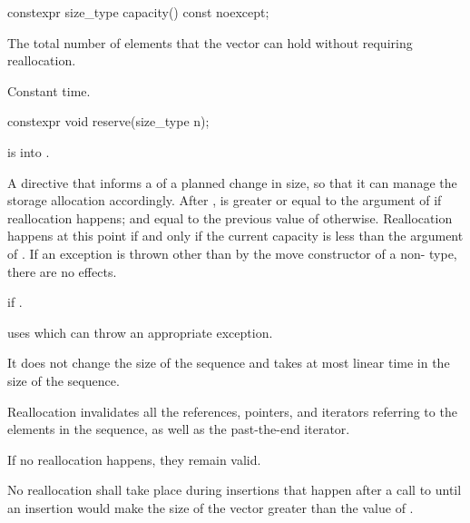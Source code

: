 %
\begin{itemdecl}
constexpr size_type capacity() const noexcept;
\end{itemdecl}

\begin{itemdescr}
\pnum
\returns
The total number of elements that the vector can hold
without requiring reallocation.

\pnum
\complexity
Constant time.
\end{itemdescr}

%
\begin{itemdecl}
constexpr void reserve(size_type n);
\end{itemdecl}

\begin{itemdescr}
\pnum
\expects
{} is  into .

\pnum
\effects
A directive that informs a
of a planned change in size, so that it can manage the storage allocation accordingly.
After
,
is greater or equal to the argument of
if reallocation happens; and equal to the previous value of
otherwise.
Reallocation happens at this point if and only if the current capacity is less than the
argument of
. If an exception is thrown
other than by the move constructor of a non- type,
there are no effects.

\pnum
\throws
{} if .
\begin{footnote}
 uses  which
can throw an appropriate exception.
\end{footnote}

\pnum
\complexity
It does not change the size of the sequence and takes at most linear
time in the size of the sequence.

\pnum
\remarks
Reallocation invalidates all the references, pointers, and iterators
referring to the elements in the sequence, as well as the past-the-end iterator.
\begin{note}
If no reallocation happens, they remain valid.
\end{note}
No reallocation shall take place during insertions that happen
after a call to 
until an insertion would make the size of the vector
greater than the value of .
\end{itemdescr}

